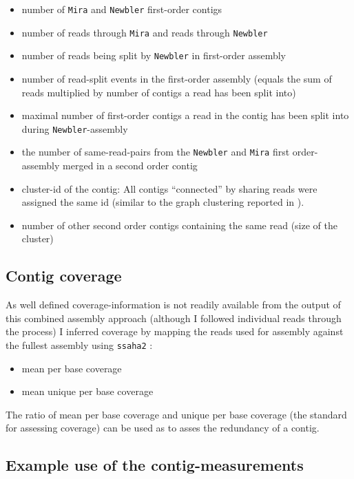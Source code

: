 \begin{itemize}
\item number of \texttt{Mira} and \texttt{Newbler} first-order contigs
\item number of reads through \texttt{Mira} and reads through \texttt{Newbler}
\item number of reads being split by \texttt{Newbler} in first-order
  assembly 
\item number of read-split events in the first-order assembly (equals
  the sum of reads multiplied by number of contigs a read has been
  split into)
\item maximal number of first-order contigs a read in the contig has
  been split into during \texttt{Newbler}-assembly 
\item the number of same-read-pairs from the \texttt{Newbler} and
  \texttt{Mira} first order-assembly merged in a second order contig
\item cluster-id of the contig: All contigs ``connected'' by sharing
  reads were assigned the same id (similar to the graph clustering
  reported in \cite{pmid21138572}).
\item number of other second order contigs containing the same read
  (size of the cluster)
\end{itemize}


\subsection{Contig coverage}

As well defined coverage-information is not readily available from the
output of this combined assembly approach (although I followed
individual reads through the process) I inferred coverage by mapping
the reads used for assembly against the fullest assembly using
\texttt{ssaha2} \cite{pmid11591649} :

\begin{itemize}
\item mean per base coverage
\item mean unique per base coverage
\end{itemize}

The ratio of mean per base coverage and unique per base coverage (the
standard for assessing coverage) can be used as to asses the redundancy
of a contig.

\subsection{Example use of the contig-measurements}


